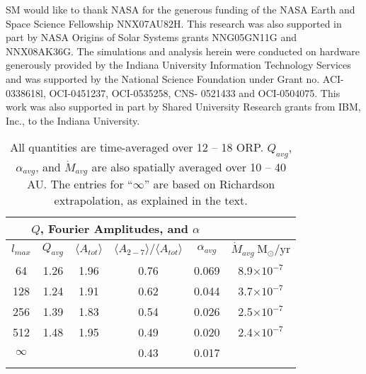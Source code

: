 \documentclass[manuscript]{aastex}
\begin{document}
\acknowledgements

SM would like to thank NASA for the generous funding of the
NASA Earth and Space Science Fellowship NNX07AU82H. This
research was also supported in part by NASA Origins of Solar
Systems grants NNG05GN11G and NNX08AK36G. The simulations
and analysis herein were conducted on hardware generously
provided by the Indiana University Information Technology Services
and was supported by the National Science Foundation under
Grant no. ACI-0338618l, OCI-0451237, OCI-0535258, CNS-
0521433 and OCI-0504075. This work was also supported in part
by Shared University Research grants from IBM, Inc., to the Indiana
University.






\newpage


\begin{table}
\begin{center}
\begin{tabular}{cccccc}
\multicolumn{5}{c}{$Q$, Fourier Amplitudes, and $\alpha$}\\ \hline\hline
$l_{max}$ & $Q_{avg}$   & $\langle A_{tot} \rangle$   & $\langle A_{2-7} \rangle / \langle A_{tot} \rangle$ &
$\alpha_{avg}$ & $\dot{M}_{avg} ~\mathrm{M_\odot/yr}$\\\hline
64   & 1.26 & 1.96 &  0.76 & 0.069 & 8.9$ \times 10^{-7}$ \\
128 & 1.24 & 1.91 &  0.62 & 0.044 & 3.7$ \times 10^{-7}$ \\
256 & 1.39 & 1.83 &  0.54 & 0.026 & 2.5$ \times 10^{-7}$ \\
512 & 1.48 & 1.95 &  0.49 & 0.020 & 2.4$ \times 10^{-7}$ \\ 
$\infty$ & & &0.43 & 0.017 & \\ \hline
\label{tbl:ams}
\end{tabular}
\caption{ All quantities are time-averaged over 12 -- 18 ORP.
$Q_{avg}$, $\alpha_{avg}$, and $\dot{M}_{avg}$  are also spatially
averaged over 10 -- 40 AU.  The entries for ``$\infty$'' are based on Richardson extrapolation,
as explained in the text.}  
\end{center}
\end{table}


\end{document}
